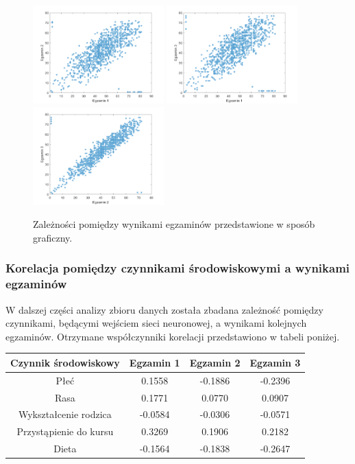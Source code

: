 \documentclass[12pt]{article}
\begin{document}
\begin{figure}[H]
\centering
\includegraphics[width=0.45\textwidth]{korelacja_egzamin12.png}
\includegraphics[width=0.45\textwidth]{korelacja_egzamin13.png}
\includegraphics[width=0.45\textwidth]{korelacja_egzamin23.png}
\caption{Zależności pomiędzy wynikami egzaminów przedstawione w sposób graficzny.}
\end{figure}

\subsubsection {Korelacja pomiędzy czynnikami środowiskowymi a wynikami egzaminów}
W dalszej części analizy zbioru danych została zbadana zależność pomiędzy czynnikami, będącymi wejściem sieci neuronowej, a wynikami kolejnych egzaminów. Otrzymane współczynniki korelacji przedstawiono w tabeli poniżej.

\begin{table}[H]
\centering
\begin{tabular}{|c|c|c|c|} 
\hline
 Czynnik środowiskowy & Egzamin 1 & Egzamin 2 & Egzamin 3  \\ 
\hline
Płeć & 0.1558  &  -0.1886 &  -0.2396  \\ 
\hline
Rasa &  0.1771  &  0.0770   & 0.0907 \\ 
\hline
Wykształcenie rodzica &  -0.0584  & -0.0306 &  -0.0571  \\ 
\hline
Przystąpienie do kursu & 0.3269  &  0.1906  &  0.2182  \\ 
\hline
Dieta &  -0.1564  & -0.1838   & -0.2647  \\ 
\hline
\end{tabular}
\end{table}
\end{document}
